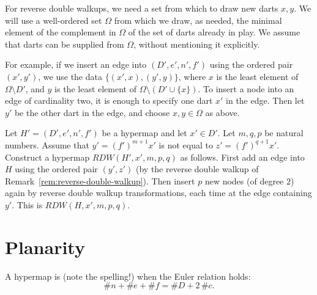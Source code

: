 \begin{remark}\label{rem:dart-universe}
For reverse double walkups, we need a set from which to draw new darts $x,y$.
We will use a well-ordered set $\Omega$ from which we draw, as needed,
the minimal element of the complement in $\Omega$ of the set of darts
already in play.  We assume that darts can be supplied from $\Omega$,
without mentioning it explicitly.  

For example, if we insert an edge into $(D',e',n',f')$
using the
ordered pair $(x',y')$, we use the data $\{(x',x),(y',y)\}$, where $x$ is the
least element of $\Omega\setminus D'$, and $y$ is the least element of
$\Omega\setminus (D'\cup \{x\})$.  To insert a node into an edge of cardinality
two, it is enough to specify one dart $x'$ in the edge.  Then let $y'$ be the other
dart in the edge, and choose $x,y\in \Omega$ as above.
\end{remark}

\begin{definition}[RDW]\label{def:R}  
  Let $H'=(D',e',n',f')$ be a hypermap and let $x'\in D'$.  
Let $m,q,p$ be natural numbers.  Assume that $y' =(f')^{m+1}x'$ is not
equal to $z'=(f')^{q+1}x'$.
Construct a hypermap $RDW(H',x',m,p,q)$  as follows.  
First
  add an edge into $H$ using the ordered pair $(y',z')$
(by the reverse double walkup of
  Remark~\ref{rem:reverse-double-walkup}).  Then insert $p$ new nodes
  (of degree $2$) again by reverse double
  walkup transformations, each time at the edge containing $y'$.  
This is $RDW(H,x',m,p,q)$.
\end{definition}


\section{Planarity}
%
%

\begin{definition}[planar]  A hypermap is  (note the
spelling!) when the Euler relation holds:
\begin{displaymath}\# n + \# e + \# f = \# D + 2\, \#c.\end{displaymath}
%
\end{definition}


